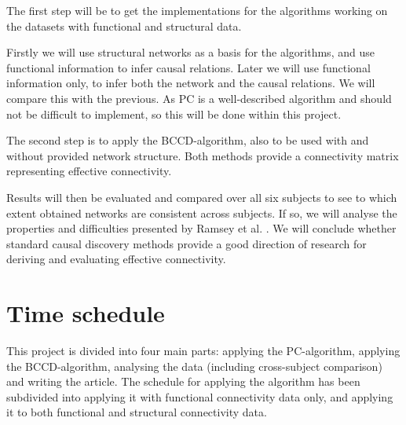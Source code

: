 \documentclass[a4paper, 10pt, english, twocolumn]{article}
\begin{document}
The first step will be to get the implementations for the algorithms working on the datasets with functional and structural data.

Firstly we will use structural networks as a basis for the algorithms, and use functional information to infer causal relations. 
Later we will use functional information only, to infer both the network and the causal relations.
We will compare this with the previous.
As PC is a well-described algorithm \cite{spirtes2000} and should not be difficult to implement, so this will be done within this project.

The second step is to apply the BCCD-algorithm, also to be used with and without provided network structure.
Both methods provide a connectivity matrix representing effective connectivity.

Results will then be evaluated and compared over all six subjects to see to which extent obtained networks are consistent across subjects.
If so, we will analyse the properties and difficulties presented by Ramsey et al. \cite{ramsey2010}.
We will conclude whether standard causal discovery methods provide a good direction of research for deriving and evaluating effective connectivity.


\section{Time schedule}
This project is divided into four main parts: applying the PC-algorithm, applying the BCCD-algorithm, analysing the data (including cross-subject comparison) and writing the article. The schedule for applying the algorithm has been subdivided into applying it with functional connectivity data only, and applying it to both functional and structural connectivity data.



{}

\end{document}
